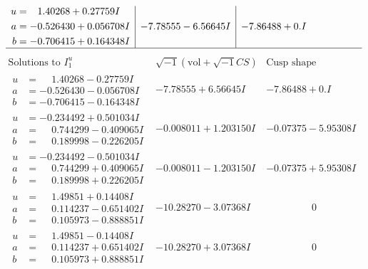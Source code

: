 \documentclass[1p]{elsarticle_modified}
\theoremstyle{definition}
\newcommand{\I}{\sqrt{-1}}
\begin{document}
$$\begin{array}{c|c|c}
\begin{aligned}
u &= \phantom{-}1.40268 + 0.27759 I \\
a &= -0.526430 + 0.056708 I \\
b &= -0.706415 + 0.164348 I\end{aligned}
 & -7.78555 - 6.56645 I & -7.86488 + 0. I\phantom{ +0.000000I}\\
 \hline 
 \end{array}$$\newpage$$\begin{array}{c|c|c}  
\text{Solutions to }I^u_{1}& \I (\text{vol} + \sqrt{-1}CS) & \text{Cusp shape}\\
 \hline 
\begin{aligned}
u &= \phantom{-}1.40268 - 0.27759 I \\
a &= -0.526430 - 0.056708 I \\
b &= -0.706415 - 0.164348 I\end{aligned}
 & -7.78555 + 6.56645 I & -7.86488 + 0. I\phantom{ +0.000000I} \\ \hline\begin{aligned}
u &= -0.234492 + 0.501034 I \\
a &= \phantom{-}0.744299 - 0.409065 I \\
b &= \phantom{-}0.189998 - 0.226205 I\end{aligned}
 & -0.008011 + 1.203150 I & -0.07375 - 5.95308 I \\ \hline\begin{aligned}
u &= -0.234492 - 0.501034 I \\
a &= \phantom{-}0.744299 + 0.409065 I \\
b &= \phantom{-}0.189998 + 0.226205 I\end{aligned}
 & -0.008011 - 1.203150 I & -0.07375 + 5.95308 I \\ \hline\begin{aligned}
u &= \phantom{-}1.49851 + 0.14408 I \\
a &= \phantom{-}0.114237 - 0.651402 I \\
b &= \phantom{-}0.105973 - 0.888851 I\end{aligned}
 & -10.28270 - 3.07368 I & \phantom{-0.000000 } 0 \\ \hline\begin{aligned}
u &= \phantom{-}1.49851 - 0.14408 I \\
a &= \phantom{-}0.114237 + 0.651402 I \\
b &= \phantom{-}0.105973 + 0.888851 I\end{aligned}
 & -10.28270 + 3.07368 I & \phantom{-0.000000 } 0 \\ \hline\begin{aligned}

\end{aligned}
\end{array}$$
\end{document}
